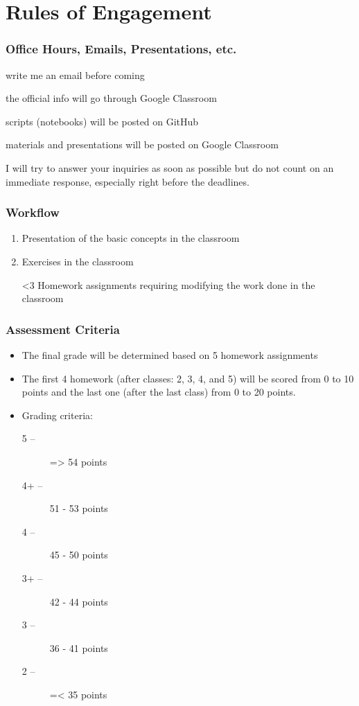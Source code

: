 \documentclass{beamer}
\begin{document}
\section{Rules of Engagement}

\begin{frame}
    \frametitle{Office Hours, Emails, Presentations, etc.}
    \begin{description}
        \item [Office Hours:] write me an email before coming
        \item [Emails:] the official info will go through Google Classroom
        \item [GitHub:] scripts (notebooks) will be posted on GitHub
        \item [Google Classroom:] materials and presentations will be posted on
        Google Classroom
    \end{description}
    \alert{I will try to answer your inquiries as soon as possible but do not
    count on an immediate response, especially right before the deadlines.}
\end{frame}
\begin{frame}
    \frametitle{Workflow}
    \begin{enumerate}
        \item Presentation of the basic concepts in the classroom
        \item Exercises in the classroom
        \item [<3] Homework assignments requiring modifying the work done in the classroom
    \end{enumerate}
\end{frame}
\begin{frame}
    \frametitle{Assessment Criteria}
    \begin{itemize}
        \item The final grade will be determined based on \alert{5 homework
        assignments}
        \item The first 4 homework (after classes: 2, 3, 4, and 5) will be scored from 0 to 10 points and the
        last one (after the last class) from 0 to 20 points.
        \item Grading criteria:
    \begin{description}
        \item [5\phantom{+} --] => 54 points
        \item [4+ --] 51 - 53 points
        \item [4\phantom{+} --] 45 - 50 points
        \item [3+ --] 42 - 44 points
        \item [3\phantom{+} --] 36 - 41 points
        \item [2\phantom{+} --] =< 35 points
    \end{description}
\end{itemize}
\end{frame}
\end{document}
